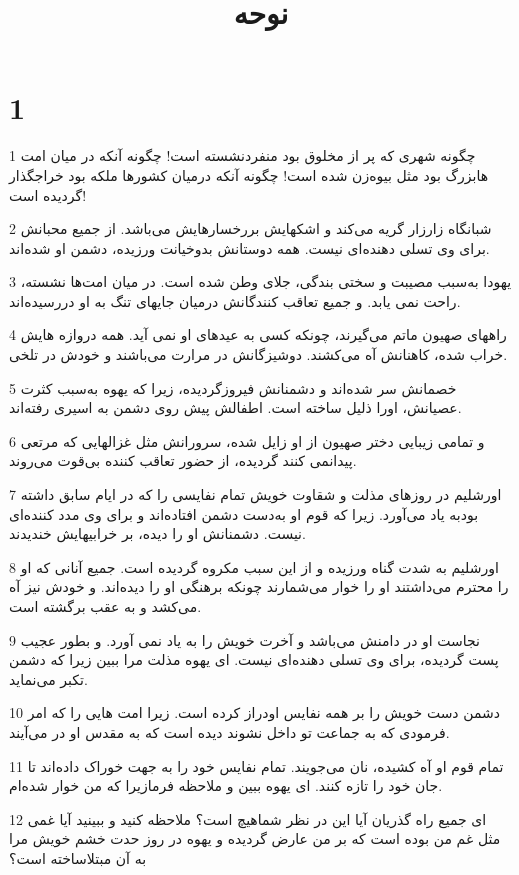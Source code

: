 

\title{نوحه}

 
\chapter{1}

\par 1 چگونه شهری که پر از مخلوق بود منفردنشسته است! چگونه آنکه در میان امت هابزرگ بود مثل بیوه‌زن شده است! چگونه آنکه درمیان کشورها ملکه بود خراجگذار گردیده است!
\par 2 شبانگاه زارزار گریه می‌کند و اشکهایش بررخسارهایش می‌باشد. از جمیع محبانش برای وی تسلی دهنده‌ای نیست. همه دوستانش بدوخیانت ورزیده، دشمن او شده‌اند.
\par 3 یهودا به‌سبب مصیبت و سختی بندگی، جلای وطن شده است. در میان امت‌ها نشسته، راحت نمی یابد. و جمیع تعاقب کنندگانش درمیان جایهای تنگ به او در‌رسیده‌اند.
\par 4 راههای صهیون ماتم می‌گیرند، چونکه کسی به عیدهای او نمی آید. همه دروازه هایش خراب شده، کاهنانش آه می‌کشند. دوشیزگانش در مرارت می‌باشند و خودش در تلخی.
\par 5 خصمانش سر شده‌اند و دشمنانش فیروزگردیده، زیرا که یهوه به‌سبب کثرت عصیانش، اورا ذلیل ساخته است. اطفالش پیش روی دشمن به اسیری رفته‌اند.
\par 6 و تمامی زیبایی دختر صهیون از او زایل شده، سرورانش مثل غزالهایی که مرتعی پیدانمی کنند گردیده، از حضور تعاقب کننده بی‌قوت می‌روند.
\par 7 اورشلیم در روزهای مذلت و شقاوت خویش تمام نفایسی را که در ایام سابق داشته بودبه یاد می‌آورد. زیرا که قوم او به‌دست دشمن افتاده‌اند و برای وی مدد کننده‌ای نیست. دشمنانش او را دیده، بر خرابیهایش خندیدند.
\par 8 اورشلیم به شدت گناه ورزیده و از این سبب مکروه گردیده است. جمیع آنانی که او را محترم می‌داشتند او را خوار می‌شمارند چونکه برهنگی او را دیده‌اند. و خودش نیز آه می‌کشد و به عقب برگشته است.
\par 9 نجاست او در دامنش می‌باشد و آخرت خویش را به یاد نمی آورد. و بطور عجیب پست گردیده، برای وی تسلی دهنده‌ای نیست. ای یهوه مذلت مرا ببین زیرا که دشمن تکبر می‌نماید.
\par 10 دشمن دست خویش را بر همه نفایس اودراز کرده است. زیرا امت هایی را که امر فرمودی که به جماعت تو داخل نشوند دیده است که به مقدس او در می‌آیند.
\par 11 تمام قوم او آه کشیده، نان می‌جویند. تمام نفایس خود را به جهت خوراک داده‌اند تا جان خود را تازه کنند. ای یهوه ببین و ملاحظه فرمازیرا که من خوار شده‌ام.
\par 12 ‌ای جمیع راه گذریان آیا این در نظر شماهیچ است؟ ملاحظه کنید و ببینید آیا غمی مثل غم من بوده است که بر من عارض گردیده و یهوه در روز حدت خشم خویش مرا به آن مبتلاساخته است؟
